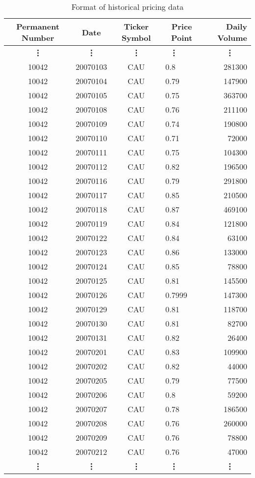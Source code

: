 \begin{table}[p]
\centering
\begin{tabular}{@{}clclr@{}}
\toprule\toprule
Permanent Number & \multicolumn{1}{c}{Date} & Ticker Symbol & \multicolumn{1}{c}{Price Point} & Daily Volume \\\midrule
\multicolumn{1}{c}{\bf\vdots} & \multicolumn{1}{c}{\bf\vdots} & \multicolumn{1}{c}{\bf\vdots} & \multicolumn{1}{l}{\bf\ \vdots\ \ } & \multicolumn{1}{r}{\bf\vdots\ \ \ } \\
10042 & 20070103 & CAU & 0.8    & 281300 \\ 
10042 & 20070104 & CAU & 0.79   & 147900 \\
10042 & 20070105 & CAU & 0.75   & 363700 \\
10042 & 20070108 & CAU & 0.76   & 211100 \\
10042 & 20070109 & CAU & 0.74   & 190800 \\
10042 & 20070110 & CAU & 0.71   & 72000  \\
10042 & 20070111 & CAU & 0.75   & 104300 \\
10042 & 20070112 & CAU & 0.82   & 196500 \\
10042 & 20070116 & CAU & 0.79   & 291800 \\
10042 & 20070117 & CAU & 0.85   & 210500 \\
10042 & 20070118 & CAU & 0.87   & 469100 \\
10042 & 20070119 & CAU & 0.84   & 121800 \\
10042 & 20070122 & CAU & 0.84   & 63100  \\
10042 & 20070123 & CAU & 0.86   & 133000 \\
10042 & 20070124 & CAU & 0.85   & 78800  \\
10042 & 20070125 & CAU & 0.81   & 145500 \\
10042 & 20070126 & CAU & 0.7999 & 147300 \\
10042 & 20070129 & CAU & 0.81   & 118700 \\
10042 & 20070130 & CAU & 0.81   & 82700  \\
10042 & 20070131 & CAU & 0.82   & 26400  \\
10042 & 20070201 & CAU & 0.83   & 109900 \\
10042 & 20070202 & CAU & 0.82   & 44000  \\
10042 & 20070205 & CAU & 0.79   & 77500  \\
10042 & 20070206 & CAU & 0.8    & 59200  \\
10042 & 20070207 & CAU & 0.78   & 186500 \\
10042 & 20070208 & CAU & 0.76   & 260000 \\
10042 & 20070209 & CAU & 0.76   & 78800  \\
10042 & 20070212 & CAU & 0.76   & 47000  \\ 
\multicolumn{1}{c}{\bf\vdots} & \multicolumn{1}{c}{\bf\vdots} & \multicolumn{1}{c}{\bf\vdots} & \multicolumn{1}{l}{\bf\ \vdots\ \ } & \multicolumn{1}{r}{\bf\vdots\ \ \ } \\
\bottomrule
\end{tabular}
\caption{Format of historical pricing data}
\label{tab:histPrice}
\end{table}
